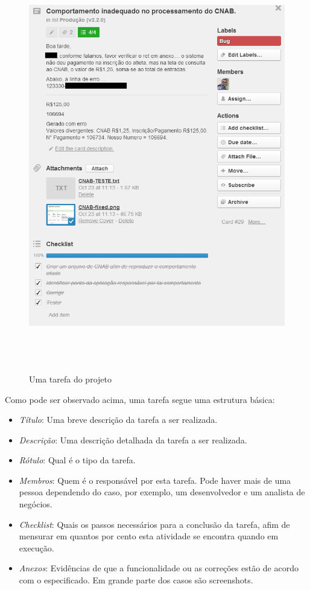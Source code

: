 \documentclass[11pt, a4paper]{article}
\begin{document}
\begin{figure}[H]
  \caption{Uma tarefa do projeto}
  \centering 
  \includegraphics[width=150mm,height=180mm]{images/card.png}
\end{figure}

Como pode ser observado acima, uma tarefa segue uma estrutura básica:
\begin{itemize}
	\item \textit{Título}: Uma breve descrição da tarefa a ser realizada.
	\item \textit{Descrição}: Uma descrição detalhada da tarefa a ser realizada.
	\item \textit{Rótulo}: Qual é o tipo da tarefa.
	\item \textit{Membros}: Quem é o responsável por esta tarefa. Pode haver mais de uma pessoa dependendo do caso, por exemplo, um desenvolvedor e um analista de negócios.
	\item \textit{Checklist}: Quais os passos necessários para a conclusão da tarefa, afim de mensurar em quantos por cento esta atividade se encontra quando em execução.
	\item \textit{Anexos}: Evidências de que a funcionalidade ou as correções estão de acordo com o especificado. Em grande parte dos casos são screenshots.
\end{itemize}
\end{document}
